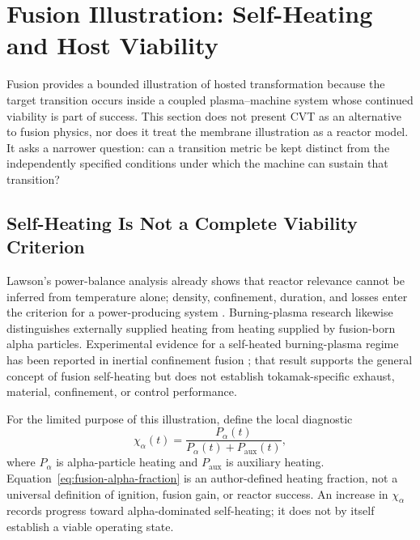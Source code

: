 
\section{Fusion Illustration: Self-Heating and Host Viability}
\label{sec:fusion}

Fusion provides a bounded illustration of hosted transformation because the target transition occurs inside a coupled plasma--machine system whose continued viability is part of success. This section does not present CVT as an alternative to fusion physics, nor does it treat the membrane illustration as a reactor model. It asks a narrower question: can a transition metric be kept distinct from the independently specified conditions under which the machine can sustain that transition?

\subsection{Self-Heating Is Not a Complete Viability Criterion}

Lawson's power-balance analysis already shows that reactor relevance cannot be inferred from temperature alone; density, confinement, duration, and losses enter the criterion for a power-producing system \cite{lawson1957}. Burning-plasma research likewise distinguishes externally supplied heating from heating supplied by fusion-born alpha particles. Experimental evidence for a self-heated burning-plasma regime has been reported in inertial confinement fusion \cite{zylstra2022}; that result supports the general concept of fusion self-heating but does not establish tokamak-specific exhaust, material, confinement, or control performance.

For the limited purpose of this illustration, define the local diagnostic
\begin{equation}
    \chi_{\alpha}(t)
    =
    \frac{P_{\alpha}(t)}{P_{\alpha}(t)+P_{\mathrm{aux}}(t)},
    \label{eq:fusion-alpha-fraction}
\end{equation}
where \(P_{\alpha}\) is alpha-particle heating and \(P_{\mathrm{aux}}\) is auxiliary heating. Equation~\eqref{eq:fusion-alpha-fraction} is an author-defined heating fraction, not a universal definition of ignition, fusion gain, or reactor success. An increase in \(\chi_{\alpha}\) records progress toward alpha-dominated self-heating; it does not by itself establish a viable operating state.

